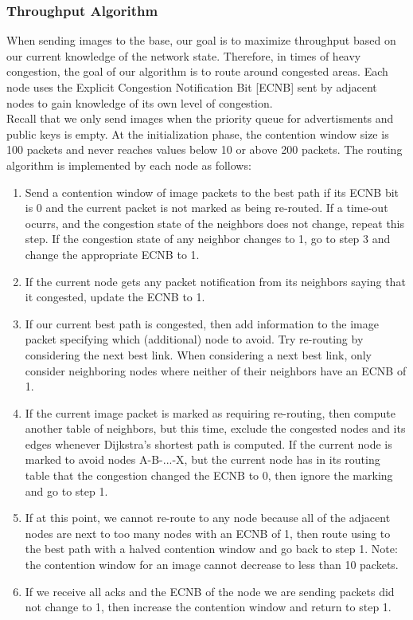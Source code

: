 \documentclass[letterpaper]{article}
\begin{document}
\subsubsection{Throughput Algorithm}

When sending images to the base, our goal is to maximize throughput based on our current knowledge of the network state. Therefore, in times of heavy congestion, the goal of our algorithm is to route around congested areas.
Each node uses the Explicit Congestion Notification Bit [ECNB] sent by adjacent nodes to gain knowledge of its own level of congestion.\\ 

Recall that we only send images when the priority queue for advertisments and public keys is empty. At the initialization phase, the contention window size is 100 packets and never reaches values below 10 or above 200 packets. The routing algorithm is implemented by each node as follows:

\begin{enumerate}

  \item Send a contention window of image packets to the best path if its ECNB bit is 0 and the current packet is not marked as being re-routed. If a time-out ocurrs, and the congestion state of the neighbors does not change, repeat this step. If the congestion state of any neighbor changes to 1, go to step 3 and change the appropriate ECNB to 1.
  \item If the current node gets any packet notification from its neighbors saying that it congested, update the ECNB to 1.
  \item If our current best path is congested, then add information to the image packet specifying which (additional) node to avoid. Try re-routing by considering the next best link. When considering a next best link, only consider neighboring nodes where neither of their neighbors have an ECNB of 1. 
  \item If the current image packet is marked as requiring re-routing, then compute another table of neighbors, but this time, exclude the congested nodes and its edges whenever Dijkstra's shortest path is computed. If the current node is marked to avoid nodes A-B-...-X, but the current node has in its routing table that the congestion changed the ECNB to 0, then ignore the marking and go to step 1.
  \item If at this point, we cannot re-route to any node because all of the adjacent nodes are next to too many nodes with an ECNB of 1, then route using to the best path with a halved contention window and go back to step 1. Note: the contention window for an image cannot decrease to less than 10 packets.
  \item If we receive all acks and the ECNB of the node we are sending packets did not change to 1, then increase the contention window and return to step 1.
\end{enumerate}
\end{document}
